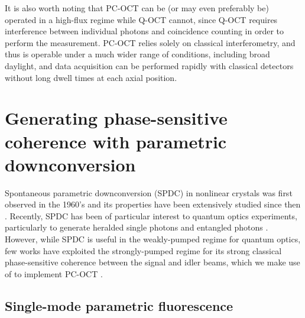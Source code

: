It is also worth noting that PC-OCT can be (or may even preferably be) operated in a high-flux regime while Q-OCT cannot, since Q-OCT requires interference between individual photons and coincidence counting in order to perform the measurement. PC-OCT relies solely on classical interferometry, and thus is operable under a much wider range of conditions, including broad daylight, and data acquisition can be performed rapidly with classical detectors without long dwell times at each axial position.

\section{Generating phase-sensitive coherence with parametric downconversion}

Spontaneous parametric downconversion (SPDC) in nonlinear crystals was first observed in the 1960's and its properties have been extensively studied since then \cite{louisell-spdc,harris-spdc,magde-spdc,akhmanov-spdc,byer-spdc,burnham-spdc,tapster-spdc}. Recently, SPDC has been of particular interest to quantum optics experiments, particularly to generate heralded single photons \cite{fasel-spdc,pittman-spdc} and entangled photons \cite{kurtsiefer-spdc,wong-spdc}. However, while SPDC is useful in the weakly-pumped regime for quantum optics, few works have exploited the strongly-pumped regime for its strong classical phase-sensitive coherence between the signal and idler beams, which we make use of to implement PC-OCT \cite{legouet-interferometry,legouet-experimental}.

\subsection{Single-mode parametric fluorescence}

